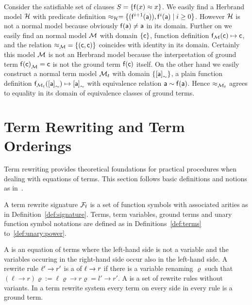 \begin{example}
	Consider the satisfiable set of clauses \( S = \{ \mathsf{f}(x) \approx x \} \).
	We easily find a Herbrand model \( \mathcal{H} \) with
	predicate definition
	\( \approx_{\mathcal{H}} = \{ (\mathsf{f}^{i+1}(\mathsf{a})), \mathsf{f}^{i}(\mathsf{a}) \mid i\geq 0  \}  \).
	However \( \mathcal{H} \) is not a normal model because obviously \( \mathsf{f}(\mathsf{a})\neq\mathsf{a} \) in its domain.
	Further on we easily find an normal model \( \mathcal{M} \)
	with domain \( \{ \mathsf{c} \} \), function definition \( \mathsf{f}_{\mathcal{M}}(\mathsf{c}) \mapsto \mathsf{c} \),
	and the relation \( {\approx_{\mathcal{M}}} = \{ (\mathsf{c},\mathsf{c})\} \) coincides with identity in its domain.
	Certainly this model \( \mathcal{M} \) is not an Herbrand model
	because the interpretation of ground term \( {\mathsf{f}(\mathsf{c})}_{\mathcal{M}} = \mathsf{c} \) is not the ground term \( \mathsf{f}(\mathsf{c}) \) itself.
	On the other hand we easily construct a normal term model
	\( \mathcal{M}_t \) with domain \( \{ {[\mathsf{a}]}_\sim \} \),
	a plain function definition
	\( \mathsf{f}_{\mathcal{M}_t}({[\mathsf{a}]}_\sim) \mapsto {[\mathsf{a}]}_\sim \)
	with equivalence relation
	\( \mathsf{a} \sim \mathsf{f}(\mathsf{a}) \).
	Hence \( \approx_{\mathcal{M}_t} \) agrees to equality in its domain of equivalence classes of ground terms.
\end{example}


\section{Term Rewriting and Term Orderings}\label{sec:termrewriting}

Term rewriting provides theoretical foundations for practical procedures
when dealing with equations of terms.
This section follows basic definitions and notions as in~\cite{AM2015L}.

\begin{definition}\label{def:rewrite:signature}
	A term rewrite signature \( {\mathcal{F}_{\mathsf{f}}} \) is a set of function symbols
	with associated arities
	as in Definition~\ref{def:signature}.
	Terms, term variables, ground terms and unary function symbol notations
	are defined as in Definitions~\ref{def:terms} to~\ref{def:unary:power}.
\end{definition}


\begin{definition}\label{def:rewriterule}
	A  is an equation of terms where the left-hand side is not a variable
	and the variables occuring in the right-hand side occur also in the left-hand side.
	A rewrite rule \( \ell'\xrightarrow[{}]{} r' \) is a  of \( \ell\xrightarrow[{}]{} r \) if there is a variable renaming \( \varrho \)
	such that
	\( (\ell\rightarrow r)\varrho := \ell\varrho\rightarrow r\varrho = l'\rightarrow r' \).
	A  is a set of rewrite rules without variants.
	In a  term rewrite system every term on every side in every rule is a ground term.
\end{definition}

